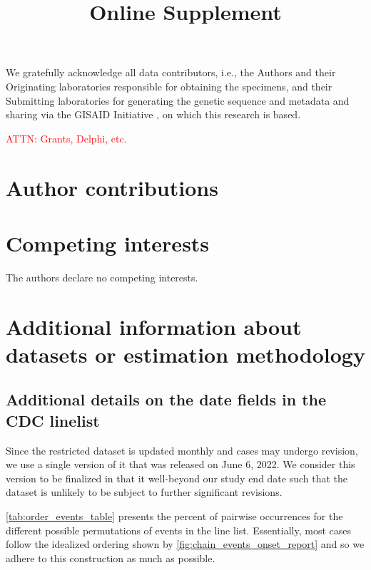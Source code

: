 \documentclass{article}
\newcommand{\beginsupplement}{
  \setcounter{table}{0}  
  \renewcommand{\thetable}{S\arabic{table}} 
  \setcounter{figure}{0} 
  \renewcommand{\thefigure}{S\arabic{figure}}
  \setcounter{section}{0} 
  \renewcommand{\thesection}{S\arabic{section}}
}
\newcommand{\attn }[1]{\textcolor{red}{ATTN: #1}}
\begin{document}
We gratefully acknowledge all data contributors, i.e., the Authors and their
Originating laboratories responsible for obtaining the specimens, and their
Submitting laboratories for generating the genetic sequence and metadata and
sharing via the GISAID Initiative \citep{elbe2017data}, on which this research
is based.

\attn{Grants, Delphi, etc.}

\section*{Author contributions}

\section*{Competing interests}

The authors declare no competing interests.





\clearpage
\beginsupplement
\title{\supptitlefont Online Supplement}
\maketitle


\section{Additional information about datasets or estimation methodology}

\subsection{Additional details on the date fields in the CDC linelist}
\label{supp:linelist-details}

Since the restricted dataset is updated
monthly and cases may undergo revision, we use a single version of it that was
released on June 6, 2022. We consider this version to be finalized in that it
well-beyond our study end date such that the dataset is unlikely to be subject
to further significant revisions.

\autoref{tab:order_events_table} presents the percent of pairwise occurrences
for the different possible permutations of events in the line list. Essentially,
most cases follow the idealized ordering shown by
\autoref{fig:chain_events_onset_report} and so we adhere to this construction as
much as possible.
\end{document}
